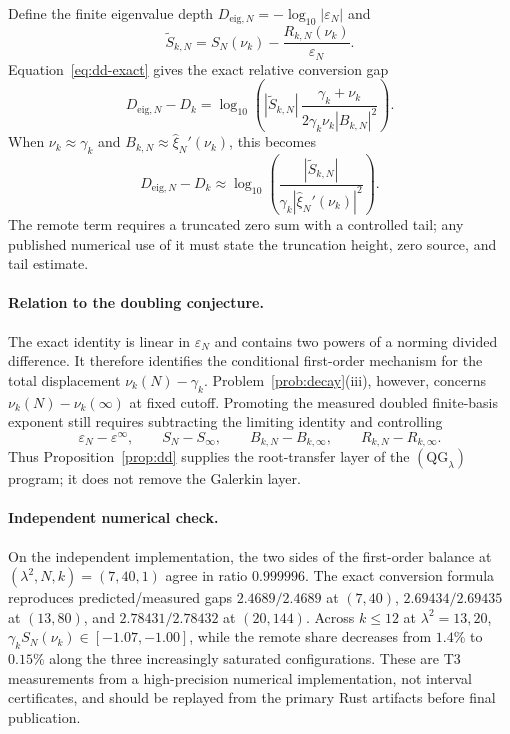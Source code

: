 \documentclass[11pt,a4paper]{article}
\begin{document}
Define the finite eigenvalue depth
$D_{\mathrm{eig},N}=-\log_{10}|\varepsilon_N|$ and
\[
 \widetilde S_{k,N}=S_N(\nu_k)-\frac{R_{k,N}(\nu_k)}{\varepsilon_N}.
\]
Equation~\eqref{eq:dd-exact} gives the exact relative conversion gap
\begin{equation}\label{eq:convexact}
 \boxed{
 D_{\mathrm{eig},N}-D_k=
 \log_{10}\!\left(
 |\widetilde S_{k,N}|\,
 \frac{\gamma_k+\nu_k}
 {2\gamma_k\nu_k|B_{k,N}|^2}\right).}
\end{equation}
When $\nu_k\approx\gamma_k$ and
$B_{k,N}\approx\widehat\xi_N'(\nu_k)$, this becomes
\begin{equation}\label{eq:convapprox}
 D_{\mathrm{eig},N}-D_k\approx
 \log_{10}\!\left(
 \frac{|\widetilde S_{k,N}|}
 {\gamma_k|\widehat\xi_N'(\nu_k)|^2}\right).
\end{equation}
The remote term requires a truncated zero sum with a controlled tail; any
published numerical use of it must state the truncation height, zero source,
and tail estimate.

\paragraph{Relation to the doubling conjecture.}
The exact identity is linear in $\varepsilon_N$ and contains two powers of a
norming divided difference. It therefore identifies the conditional
first-order mechanism for the total displacement $\nu_k(N)-\gamma_k$.
Problem~\ref{prob:decay}(iii), however, concerns
$\nu_k(N)-\nu_k(\infty)$ at fixed cutoff. Promoting the measured doubled
finite-basis exponent still requires subtracting the limiting identity and
controlling
\[
 \varepsilon_N-\varepsilon^\infty,\qquad
 S_N-S_\infty,\qquad B_{k,N}-B_{k,\infty},\qquad
 R_{k,N}-R_{k,\infty}.
\]
Thus Proposition~\ref{prop:dd} supplies the root-transfer layer of the
$(\mathrm{QG}_\lambda)$ program; it does not remove the Galerkin layer.

\paragraph{Independent numerical check.}
On the independent implementation, the two sides of the first-order balance
at $(\lambda^2,N,k)=(7,40,1)$ agree in ratio $0.999996$. The exact conversion
formula reproduces predicted/measured gaps $2.4689/2.4689$ at $(7,40)$,
$2.69434/2.69435$ at $(13,80)$, and $2.78431/2.78432$ at $(20,144)$.
Across $k\le12$ at $\lambda^2=13,20$,
$\gamma_kS_N(\nu_k)\in[-1.07,-1.00]$, while the remote share decreases from
$1.4\%$ to $0.15\%$ along the three increasingly saturated configurations.
These are T3 measurements from a high-precision numerical implementation, not
interval certificates, and should be replayed from the primary Rust artifacts
before final publication.
\end{document}
